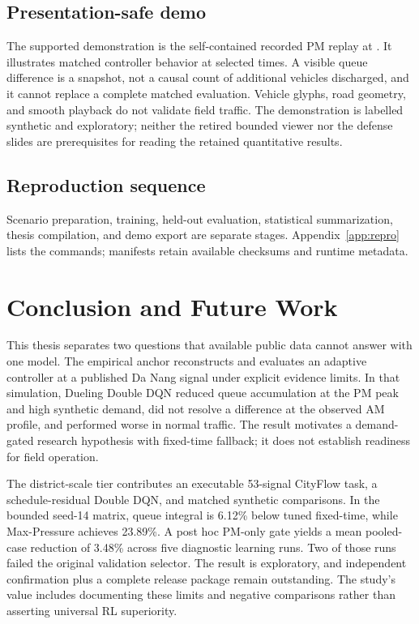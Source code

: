 \documentclass[12pt,a4paper]{report}
\newcommand{\ddqn}{Dueling Double DQN}
\begin{document}
\section{Presentation-safe demo}
The supported demonstration is the self-contained recorded PM replay at . It illustrates matched controller behavior at selected times. A visible queue difference is a snapshot, not a causal count of additional vehicles discharged, and it cannot replace a complete matched evaluation. Vehicle glyphs, road geometry, and smooth playback do not validate field traffic. The demonstration is labelled synthetic and exploratory; neither the retired bounded viewer nor the defense slides are prerequisites for reading the retained quantitative results.

\section{Reproduction sequence}
Scenario preparation, training, held-out evaluation, statistical summarization, thesis compilation, and demo export are separate stages. Appendix~\ref{app:repro} lists the commands; manifests retain available checksums and runtime metadata.

\chapter{Conclusion and Future Work}\label{ch:conclusion}

This thesis separates two questions that available public data cannot answer with one model. The empirical anchor reconstructs and evaluates an adaptive controller at a published Da Nang signal under explicit evidence limits. In that simulation, \ddqn{} reduced queue accumulation at the PM peak and high synthetic demand, did not resolve a difference at the observed AM profile, and performed worse in normal traffic. The result motivates a demand-gated research hypothesis with fixed-time fallback; it does not establish readiness for field operation.

The district-scale tier contributes an executable 53-signal CityFlow task, a schedule-residual Double DQN, and matched synthetic comparisons. In the bounded seed-14 matrix, queue integral is 6.12\% below tuned fixed-time, while Max-Pressure achieves 23.89\%. A post hoc PM-only gate yields a mean pooled-case reduction of 3.48\% across five diagnostic learning runs. Two of those runs failed the original validation selector. The result is exploratory, and independent confirmation plus a complete release package remain outstanding. The study's value includes documenting these limits and negative comparisons rather than asserting universal RL superiority.
\end{document}
